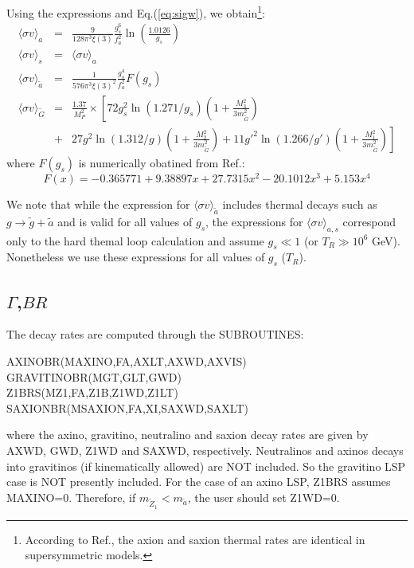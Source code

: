 \documentclass[preprint,notoc]{JHEP3}
\def\to{\rightarrow}
\def\ta{\tilde a}
\def\tG{\widetilde G}
\def\ta{\tilde a}
\def\tg{\tilde g}
\def\tz{\widetilde Z}
\def\be{\begin{equation}}
\def\ee{\end{equation}}
\def\sigv{\langle \sigma v \rangle}
\def\to{\rightarrow}
\begin{document}
Using the expressions \cite{graff2,strumia,pradler} and Eq.(\ref{eq:sigw}), we obtain\footnote{According to Ref.\cite{graff2}, the axion and
saxion thermal rates are identical in supersymmetric models.}:
\begin{eqnarray*}
\sigv_{a} & = & \frac{9}{128 \pi^3 \xi(3)} \frac{g_s^6}{f_a^2}\ln(\frac{1.0126}{g_s})\\
\sigv_{s} & = & \sigv_{a}\\
\sigv_{\ta} & = & \frac{1}{576 \pi^3 \xi(3)^2} \frac{g_s^4}{f_a^2}F(g_s)\\
\sigv_{\tG} & = & \frac{1.37}{M_P^2}\times \left[ 72 g_s^2 \ln(1.271/g_s)(1+\frac{M_3^2}{3 m_{\tG}^2})\right. \\
&+& \left. 27 g^2 \ln(1.312/g)(1+\frac{M_2^2}{3 m_{\tG}^2}) + 11 g'^2 \ln(1.266/g')(1+\frac{M_1^2}{3 m_{\tG}^2}) \right]
\end{eqnarray*}
where $F(g_s)$ is numerically obatined from Ref.\cite{strumia}:
\be
F(x) = -0.365771 + 9.38897 x + 27.7315 x^2 - 20.1012 x^3 + 5.153 x^4
\ee

We note that while the expression for $\sigv_{\ta}$ includes thermal decays such as $g \to \tg + \ta$ and is valid for all values of $g_s$,
the expressions for $\sigv_{a,s}$ correspond only to the hard themal loop calculation and assume $g_s \ll 1$ (or $T_R \gg 10^6$ GeV). Nonetheless
we use these expressions for all values of $g_s$ ($T_R$).

\subsection{$\Gamma$,$BR$}
The decay rates are computed through the SUBROUTINES:
\begin{center}
AXINOBR(MAXINO,FA,AXLT,AXWD,AXVIS)\\
GRAVITINOBR(MGT,GLT,GWD)\\
Z1BRS(MZ1,FA,Z1B,Z1WD,Z1LT)\\
SAXIONBR(MSAXION,FA,XI,SAXWD,SAXLT)
\end{center}
where the axino, gravitino, neutralino and saxion decay rates are given by AXWD, GWD, Z1WD and SAXWD, respectively.
Neutralinos and axinos decays into gravitinos (if kinematically allowed) are NOT included. So the gravitino LSP
case is NOT presently included. For the case of an axino LSP, Z1BRS assumes MAXINO=0. Therefore, if $m_{\tz_1} < m_{\ta}$,
the user should set Z1WD=0.
\end{document}
